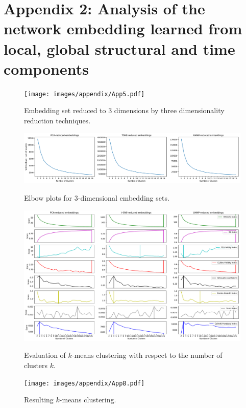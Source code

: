 \chapter{Appendix 2: Analysis of the network embedding learned from local, global structural and time components}
\label{appendix:k-means_time_struc}

\begin{figure}[!ht]
	\centering
	\texttt{[image: images/appendix/App5.pdf]}\\
	\caption{Embedding set reduced to 3 dimensions by three dimensionality reduction techniques.}
	\label{fig:App5}
\end{figure}
\begin{figure}[!ht]
	\centering
	\includegraphics[width=1.0\textwidth]{images/appendix/App6.pdf}\\
	\caption{Elbow plots for 3-dimensional embedding sets.}
	\label{fig:App6}
\end{figure}
\begin{figure}[!ht]
	\centering
	\includegraphics[width=1.0\textwidth]{images/appendix/App7.pdf}\\
	\caption{Evaluation of $k$-means clustering with respect to the number of clusters $k$.}
	\label{fig:App7}
\end{figure}
\begin{figure}[!ht]
	\centering
	\texttt{[image: images/appendix/App8.pdf]}\\
	\caption{Resulting $k$-means clustering.}
	\label{fig:App8}
\end{figure}

